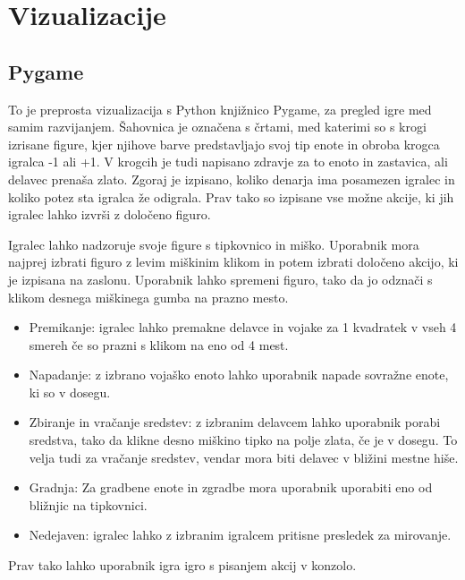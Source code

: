 \documentclass[a4paper, 12pt]{book}
\begin{document}
\chapter{Vizualizacije}
\label{chvizualizacija}

\section{Pygame}
To je preprosta vizualizacija s Python knjižnico Pygame, za pregled igre med samim razvijanjem. Šahovnica je označena s črtami, med katerimi so s krogi izrisane figure, kjer njihove barve predstavljajo svoj tip enote in obroba krogca igralca -1 ali +1.
V krogcih je tudi napisano zdravje za to enoto in zastavica, ali delavec prenaša zlato.
Zgoraj je izpisano, koliko denarja ima posamezen igralec in koliko potez sta igralca že odigrala. Prav tako so izpisane vse možne akcije, ki jih igralec lahko izvrši z določeno figuro.

Igralec lahko nadzoruje svoje figure s tipkovnico in miško.
Uporabnik mora najprej izbrati figuro z levim miškinim klikom in potem izbrati določeno akcijo, ki je izpisana na zaslonu. Uporabnik lahko spremeni figuro, tako da jo odznači s klikom desnega miškinega gumba na prazno mesto.

\begin{itemize}
	\item Premikanje: igralec lahko premakne delavce in vojake za 1 kvadratek v vseh 4 smereh če so prazni s klikom na eno od 4 mest.
	\item Napadanje: z izbrano vojaško enoto lahko uporabnik napade sovražne enote, ki so v dosegu.
	\item Zbiranje in vračanje sredstev: z izbranim delavcem lahko uporabnik porabi sredstva, tako da klikne desno miškino tipko na polje zlata, če je v dosegu. To velja tudi za vračanje sredstev, vendar mora biti delavec v bližini mestne hiše.
	\item Gradnja: Za gradbene enote in zgradbe mora uporabnik uporabiti eno od bližnjic na tipkovnici.
	\item Nedejaven: igralec lahko z izbranim igralcem pritisne presledek za mirovanje.
\end{itemize}

Prav tako lahko uporabnik igra igro s pisanjem akcij v konzolo.
\end{document}
